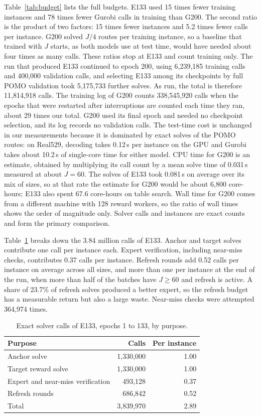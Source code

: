 \documentclass[preprint,12pt,authoryear]{elsarticle}
\begin{document}
Table~\ref{tab:budget} lists the full budgets. E133 used 15 times fewer training instances and 78 times fewer Gurobi calls in training than G200. The second ratio is the product of two factors: 15 times fewer instances and 5.2 times fewer calls per instance. G200 solved $J/4$ routes per training instance, so a baseline that trained with $J$ starts, as both models use at test time, would have needed about four times as many calls. These ratios stop at E133 and count training only. The run that produced E133 continued to epoch 200, using 6,239,185 training calls and 400,000 validation calls, and selecting E133 among its checkpoints by full POMO validation took 5,175,733 further solves. As run, the total is therefore 11,814,918 calls. The training log of G200 counts 338,545,920 calls when the epochs that were restarted after interruptions are counted each time they ran, about 29 times our total. G200 used its final epoch and needed no checkpoint selection, and its log records no validation calls. The test-time cost is unchanged in our measurements because it is dominated by exact solves of the POMO routes: on Real529, decoding takes 0.12\,s per instance on the GPU and Gurobi takes about 10.2\,s of single-core time for either model. CPU time for G200 is an estimate, obtained by multiplying its call count by a mean solve time of 0.031\,s measured at about $J = 60$. The solves of E133 took 0.081\,s on average over its mix of sizes, so at that rate the estimate for G200 would be about 6,800 core-hours; E133 also spent 67.6 core-hours on table search. Wall time for G200 comes from a different machine with 128 reward workers, so the ratio of wall times shows the order of magnitude only. Solver calls and instances are exact counts and form the primary comparison.

Table~\ref{tab:calls} breaks down the 3.84 million calls of E133. Anchor and target solves contribute one call per instance each. Expert verification, including near-miss checks, contributes 0.37 calls per instance. Refresh rounds add 0.52 calls per instance on average across all sizes, and more than one per instance at the end of the run, when more than half of the batches have $J \ge 60$ and refresh is active. A share of 23.7\% of refresh solves produced a better expert, so the refresh budget has a measurable return but also a large waste. Near-miss checks were attempted 364,974 times.

\begin{table}[t]
\centering
\caption{Exact solver calls of E133, epochs 1 to 133, by purpose.}
\label{tab:calls}
\small
\begin{tabular}{lrr}
\toprule
Purpose & Calls & Per instance \\
\midrule
Anchor solve & 1,330,000 & 1.00 \\
Target reward solve & 1,330,000 & 1.00 \\
Expert and near-miss verification & 493,128 & 0.37 \\
Refresh rounds & 686,842 & 0.52 \\
Total & 3,839,970 & 2.89 \\
\bottomrule
\end{tabular}
\end{table}
\end{document}
